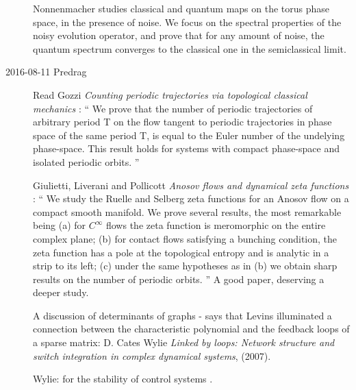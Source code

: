 \begin{description}
{Nonnenmacher studies classical and quantum maps on the torus
phase space, in the presence of noise. We focus on the spectral properties of
the noisy evolution operator, and prove that for any amount of noise, the
quantum spectrum converges to the classical one in the semiclassical limit.
    }



\item[2016-08-11 Predrag]
Read Gozzi
{\em Counting periodic trajectories via topological classical mechanics}
: ``
We prove that the number of periodic trajectories of arbitrary period T
on the flow tangent to periodic trajectories in phase space of the same
period T, is equal to the Euler number of the undelying phase-space. This
result holds for systems with compact phase-space and isolated periodic
orbits.
''

Giulietti, Liverani and Pollicott
{\em Anosov flows and dynamical zeta functions}
: ``
We study the Ruelle and Selberg zeta functions for an Anosov flow on a
compact smooth manifold. We prove several results, the most remarkable
being (a) for $C^\infty$ flows the zeta function is meromorphic on the
entire complex plane; (b) for contact flows satisfying a bunching
condition, the zeta function has a pole at the topological entropy and is
analytic in a strip to its left; (c) under the same hypotheses as in (b)
we obtain sharp results on the number of periodic orbits.
''
A good paper, deserving a deeper study.

A discussion of determinants of graphs -
says that Levins illuminated a connection between
the characteristic polynomial and the feedback loops of a sparse matrix:
 D. Cates Wylie
        {\em Linked by loops: Network structure and switch integration
                in complex dynamical systems},
         (2007).

 Wylie: for the stability of control systems 
 .



\end{description}
